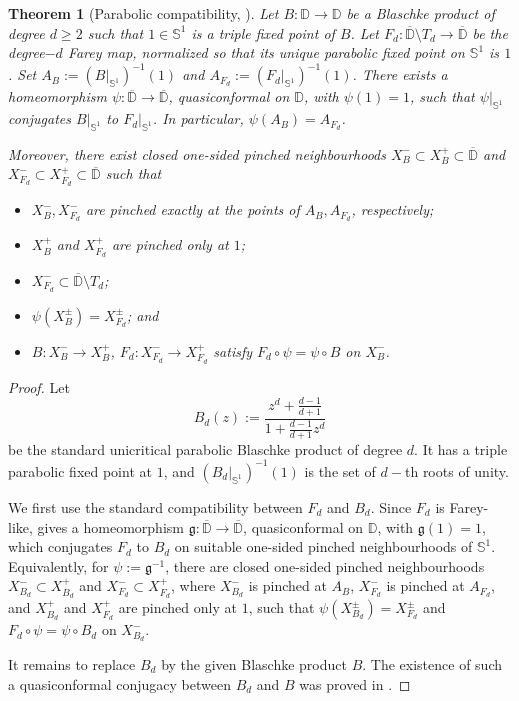 \documentclass[11pt,a4paper, oneside]{amsart}
\newtheorem{thm}{Theorem}[section]
\theoremstyle{definition}
\theoremstyle{remark}
\numberwithin{equation}{section}
\def\D{{\mathbb{D}}}
\renewcommand{\ge}{\geqslant}
\newcommand{\Circle}{{{\mathbb S}^1}}
\begin{document}
\begin{thm}[Parabolic compatibility, {\cite[Lemma~5.2]{BLLM}}]
	\label{Thm:ParabolicCompatibility}
	Let $B:\D\to\D$ be a Blaschke product of degree $d\ge2$ such that $1\in\Circle$ is a triple fixed point of $B$. 
	Let $F_d:\overline\D\setminus T_d\to\overline\D$ be the degree$-d$ Farey map,
	normalized so that its unique parabolic fixed point on $\Circle$ is $1$. Set $A_B:=(B|_{\Circle})^{-1}(1)$ and $A_{F_d}:=(F_d|_{\Circle})^{-1}(1)$. There exists a homeomorphism
	$\psi:\overline\D\to\overline\D$, quasiconformal on $\D$, with $\psi(1)=1$,
	such that $\psi|_{\Circle}$ conjugates $B|_{\Circle}$ to $F_d|_{\Circle}$.
	In particular, $\psi(A_B)=A_{F_d}$.
	
	Moreover, there exist closed one-sided pinched neighbourhoods
	$X_B^-\subset X_B^+\subset\overline\D$ and
	$X_{F_d}^-\subset X_{F_d}^+\subset\overline\D$ such that
\begin{itemize}%
    \item $X_B^-, X_{F_d}^-$ are pinched exactly at	the points of $A_B, A_{F_d}$, respectively;
    \item $X_B^+$ and $X_{F_d}^+$ are pinched only at $1$;
    \item  $X_{F_d}^-\subset\overline\D\setminus
	T_d$;
    \item $\psi(X_B^\pm)=X_{F_d}^\pm$; and
    \item $B:X_B^-\to X_B^+$,
	$F_d:X_{F_d}^-\to X_{F_d}^+$ satisfy $F_d\circ\psi=\psi\circ B$ on $X_B^-$.
    \end{itemize}
\end{thm}

\begin{proof}
	Let 
    \[
    B_d(z):=\frac{z^d+\frac{d-1}{d+1}}{1+\frac{d-1}{d+1}z^d}
    \]
    be the standard unicritical parabolic Blaschke product of degree $d$. It has a triple parabolic fixed point at $1$,
	and $(B_d|_{\Circle})^{-1}(1)$ is the set of $d-$th roots of unity.
	
	We first use the standard compatibility between $F_d$ and $B_d$. Since $F_d$ is
	Farey-like, \cite[Lemma~5.2]{BLLM} gives a homeomorphism
	$\mathfrak g:\overline\D\to\overline\D$, quasiconformal on $\D$, with
	$\mathfrak g(1)=1$, which conjugates $F_d$ to $B_d$ on suitable one-sided
	pinched neighbourhoods of $\Circle$. Equivalently, for
	$\psi:=\mathfrak g^{-1}$, there are closed one-sided pinched
	neighbourhoods $X_{B_d}^-\subset X_{B_d}^+$ and $X_{F_d}^-\subset X_{F_d}^+$, where $X_{B_d}^-$ is
	pinched at $A_B$, $X_{F_d}^-$ is pinched at $A_{F_d}$, and
	$X_{B_d}^+$ and $X_{F_d}^+$ are pinched only at $1$, such that
	$\psi(X_{B_d}^\pm)=X_{F_d}^\pm$ and $F_d\circ\psi=\psi\circ B_d$ on $X_{B_d}^-$.

    It remains to replace $B_d$ by the given Blaschke product $B$. The existence of such a quasiconformal conjugacy between $B_d$ and $B$ was proved in \cite[Proposition~6.8]{McM88}. 
    \end{proof}
\end{document}
